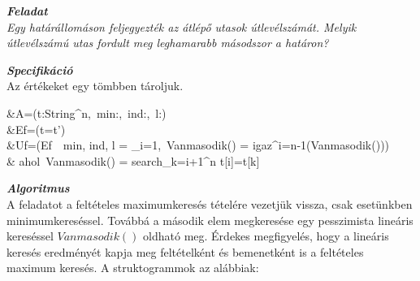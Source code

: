 \documentclass[12pt,a4paper]{article}			%
\newcommand{\fejezet}[1]{\noindent \textbf{\textit{\large #1 \vspace{5mm}}}}
\begin{document}
	
	\fejezet{Feladat}\\
	\textit{Egy határállomáson feljegyezték az átlépő utasok útlevélszámát. Melyik útlevélszámú
	utas fordult meg leghamarabb másodszor a határon?}
	\vspace{5mm}

	\fejezet{Specifikáció}\\
	Az értékeket egy tömbben tároljuk. 
		\begin{flalign*}
			&A=(t:String^n,~min:\mathbb{N},~ind:,~l:)\\
			&Ef=(t=t')\\
			&Uf=(Ef~\wedge~min, ind, l = \min _{i=1,~Vanmasodik() = igaz}^{i=n-1}(Vanmasodik()))\\
			& ahol~Vanmasodik() = search_{k=i+1}^{n} t[i]=t[k]
		\end{flalign*}
	
	\fejezet{Algoritmus}\\
	A feladatot a feltételes maximumkeresés tételére vezetjük vissza, csak esetünkben minimumkereséssel. Továbbá a második elem megkeresése egy pesszimista lineáris kereséssel $Vanmasodik()$ oldható meg. Érdekes megfigyelés, hogy a lineáris keresés eredményét kapja meg feltételként és bemenetként is a feltételes maximum keresés. A struktogrammok az alábbiak: \vspace{5mm}\\
		\noindent\hfill
		\begin{stukibox}[6cm]
		\end{stukibox}
		\hfill
		\begin{stukibox}[4cm]
		\end{stukibox}
		\hfill{}
\end{document}
